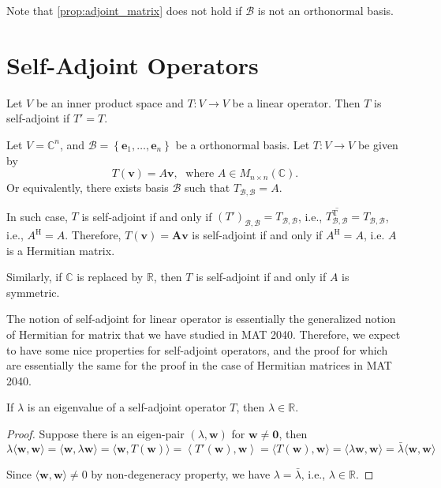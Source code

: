 Note that \autoref{prop:adjoint_matrix} does not hold if \(\mathcal{B}\) is not an orthonormal basis.

\section{Self-Adjoint Operators}
\begin{definition}
Let \(V\) be an inner product space and \(T : V \rightarrow  V\) be a linear operator. Then \(T\) is self-adjoint if \(T' = T\).
\end{definition}

\begin{example} \label{eg: self_adjoint_matrix_transformation}
Let \(V = {\mathbb{C}}^{n}\), and \(\mathcal{B} = \left\{  {{\mathbf{e}}_{1},\ldots,{\mathbf{e}}_{n}}\right\}\) be a orthonormal basis. Let \(T : V \rightarrow  V\) be given by
\[
T\left( \mathbf{v}\right)  = A\mathbf{v},\;\text{ where }A \in  {M}_{n \times  n}\left( \mathbb{C}\right).
\]
Or equivalently, there exists basis \(\mathcal{B}\) such that \(T_{\mathcal{B},\mathcal{B}} = A\).

In such case, \(T\) is self-adjoint if and only if \({\left( T'\right) }_{\mathcal{B},\mathcal{B}} = T_{\mathcal{B},\mathcal{B}}\), i.e., \(\overline{T_{\mathcal{B},\mathcal{B}}^{\mathrm{T}}} = T_{\mathcal{B},\mathcal{B}}\), i.e., \({A}^{\mathrm{H}} = A.\)
Therefore, \(T\left( \mathbf{v}\right)  = \mathbf{{Av}}\) is self-adjoint if and only if \({A}^{\mathrm{H}} = A\), i.e. $A$ is a Hermitian matrix.

Similarly, if \(\mathbb{C}\) is replaced by \(\mathbb{R}\), then \(T\) is self-adjoint if and only if \(A\) is symmetric.
\end{example}

The notion of self-adjoint for linear operator is essentially the generalized notion of Hermitian for matrix that we have studied in MAT 2040. Therefore, we expect to have some nice properties for self-adjoint operators, and the proof for which are essentially the same for the proof in the case of Hermitian matrices in MAT 2040.

\begin{proposition}\label{prop: self-adjoint-eigenvalue}
If \(\lambda\) is an eigenvalue of a self-adjoint operator \(T\), then \(\lambda \in \mathbb{R}\).
\end{proposition}

\begin{proof}
Suppose there is an eigen-pair \(\left( {\lambda,\mathbf{w}}\right)\) for \(\mathbf{w} \neq  \mathbf{0}\), then
\[
\lambda \langle \mathbf{w},\mathbf{w}\rangle  = \langle \mathbf{w},\lambda \mathbf{w}\rangle
= \langle \mathbf{w},T\left( \mathbf{w}\right) \rangle  = \left\langle  {T'\left( \mathbf{w}\right),\mathbf{w}}\right\rangle
= \langle T\left( \mathbf{w}\right),\mathbf{w}\rangle  = \langle \lambda \mathbf{w},\mathbf{w}\rangle
= \bar{\lambda }\langle \mathbf{w},\mathbf{w}\rangle
\]

Since \(\langle \mathbf{w},\mathbf{w}\rangle  \neq  0\) by non-degeneracy property, we have \(\lambda  = \bar{\lambda }\), i.e., \(\lambda  \in  \mathbb{R}\).
\end{proof}

